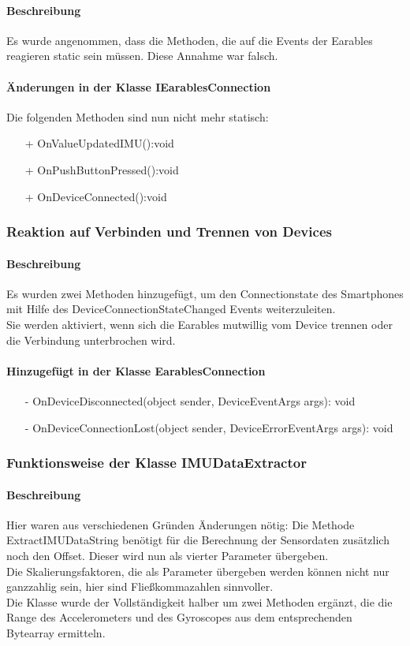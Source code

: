 \documentclass[a4paper,12pt]{article}
\begin{document}
\paragraph{Beschreibung}
Es wurde angenommen, dass die Methoden, die auf die Events der Earables reagieren static sein müssen. Diese Annahme war falsch.
\paragraph{Änderungen in der Klasse IEarablesConnection}
Die folgenden Methoden sind nun nicht mehr statisch:
\begin{itemize}
  \item[+]OnValueUpdatedIMU():void
  \item[+]OnPushButtonPressed():void
  \item[+]OnDeviceConnected():void 
\end{itemize}


\subsubsection{Reaktion auf Verbinden und Trennen von Devices}
\paragraph{Beschreibung}
Es wurden zwei Methoden hinzugefügt, um den Connectionstate des Smartphones mit Hilfe des DeviceConnectionStateChanged Events weiterzuleiten.\\
 Sie werden aktiviert, wenn sich die Earables mutwillig vom Device trennen oder die Verbindung unterbrochen wird.
\paragraph{Hinzugefügt in der Klasse EarablesConnection}

\begin{itemize}
	\item[-] OnDeviceDisconnected(object sender, DeviceEventArgs args): void 
	\item[-] OnDeviceConnectionLost(object sender, DeviceErrorEventArgs args): void
\end{itemize}

\subsubsection{Funktionsweise der Klasse IMUDataExtractor}
\paragraph{Beschreibung}
Hier waren aus verschiedenen Gründen Änderungen nötig: 
Die Methode ExtractIMUDataString benötigt für die Berechnung der Sensordaten zusätzlich noch den Offset. Dieser wird nun als vierter Parameter übergeben.\\
 Die Skalierungsfaktoren, die als Parameter übergeben werden können nicht nur ganzzahlig sein, hier sind Fließkommazahlen sinnvoller.\\
Die Klasse wurde der Vollständigkeit halber um zwei Methoden ergänzt, die die Range des Accelerometers und des Gyroscopes aus dem entsprechenden Bytearray ermitteln.
\end{document}
